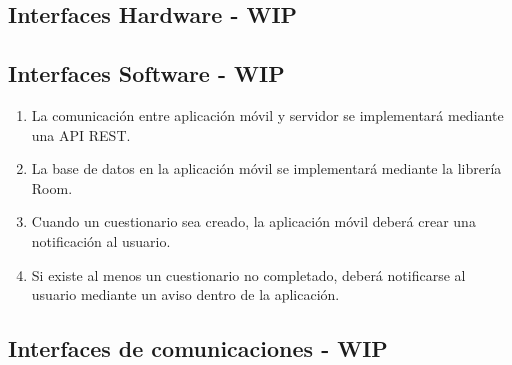     \subsection{Interfaces Hardware - WIP}
        \label{req:interfaces:hardware}
    
    \subsection{Interfaces Software - WIP}
        \label{req:interfaces:software}
        \begin{enumerate}[label=\textbf{\texttt{RIS-\arabic*}}]
            \item La comunicación entre aplicación móvil y servidor se implementará mediante una API REST.
            \item La base de datos en la aplicación móvil se implementará mediante la librería Room.
            \item Cuando un cuestionario sea creado, la aplicación móvil deberá crear una notificación al usuario.
            \item Si existe al menos un cuestionario no completado, deberá notificarse al usuario mediante un aviso dentro de la aplicación.
    
        \end{enumerate}
    
    \subsection{Interfaces de comunicaciones - WIP}
        \label{req:interfaces:comnicaciones}
    

